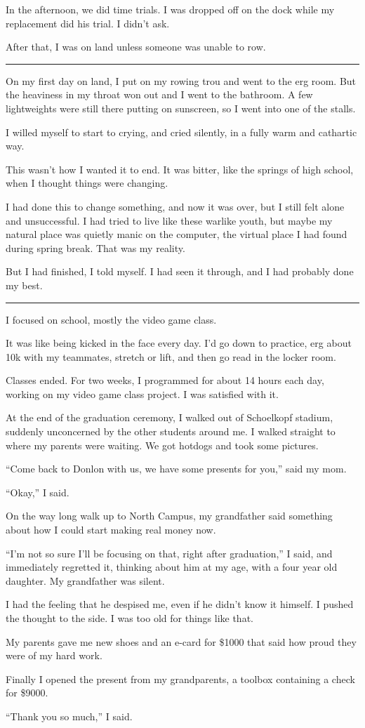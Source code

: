 In the afternoon, we did time trials.  I was dropped off on the dock while my
replacement did his trial.  I didn't ask.

After that, I was on land unless someone was unable to row.
 
\plainfancybreak{12pt}{2}{}

On my first day on land, I put on my rowing trou and went to the erg room.  But
the heaviness in my throat won out and I went to the bathroom.  A few
lightweights were still there putting on sunscreen, so I went into one of the
stalls.  

I willed myself to start to crying, and cried silently, in a fully warm and
cathartic way.  

This wasn't how I wanted it to end.  It was bitter, like the springs of high
school, when I thought things were changing.  

I had done this to change something, and now it was over, but I still felt alone
and unsuccessful.  I had tried to live like these warlike youth, but maybe my
natural place was quietly manic on the computer, the virtual place I had found
during spring break.  That was my reality.

But I had finished, I told myself.  I had seen it through, and I had probably
done my best.

\plainfancybreak{12pt}{2}{}

I focused on school, mostly the video game class.

It was like being kicked in the face every day.  I'd go down to practice, erg
about 10k with my teammates, stretch or lift, and then go read in the locker
room.

Classes ended.  For two weeks, I programmed for about 14 hours each day, working
on my video game class project.  I was satisfied with it.

At the end of the graduation ceremony, I walked out of Schoelkopf stadium,
suddenly unconcerned by the other students around me.  I walked straight to
where my parents were waiting.  We got hotdogs and took some pictures.  

``Come back to Donlon with us, we have some presents for you,'' said my mom. 

``Okay,'' I said.  

On the way long walk up to North Campus, my grandfather said something about how
I could start making real money now.

``I'm not so sure I'll be focusing on that, right after graduation,'' I said,
and immediately regretted it, thinking about him at my age, with a four year old
daughter.  My grandfather was silent.  

I had the feeling that he despised me, even if he didn't know it himself.  I
pushed the thought to the side.  I was too old for things like that.

My parents gave me new shoes and an e-card for \$1000 that said how proud they
were of my hard work.  

Finally I opened the present from my grandparents, a toolbox containing a check
for \$9000.  

``Thank you so much,'' I said.
